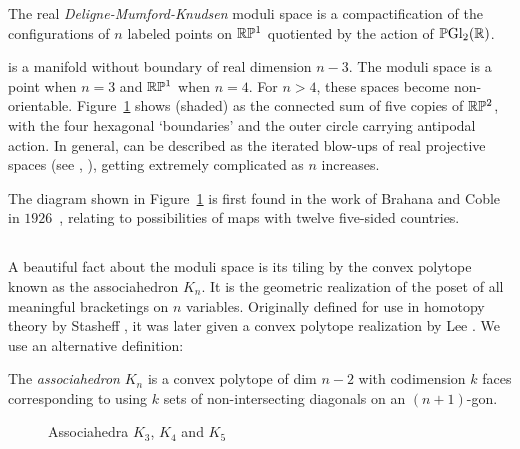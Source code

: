 \documentclass[10pt]{amsart}
\begin{document}
\begin{defn}
The real {\em Deligne-Mumford-Knudsen} moduli space  is a compactification of the configurations of $n$ labeled points on ${\mathbb R} {\mathbb P}^1$ quotiented by the action of ${\mathbb P} {\rm Gl}_2({\mathbb R})$.
\end{defn}

 is a manifold without boundary of real dimension $n-3$. The moduli space is a point when $n=3$ and ${\mathbb R}{\mathbb P}^1$ when $n=4$. For $n>4$, these spaces become non-orientable. Figure~\ref{m05} shows  (shaded) as the connected sum of five copies of ${\mathbb R} {\mathbb P}^2$, with the four hexagonal `boundaries' and the outer circle carrying antipodal action.  In general,  can be described as the iterated blow-ups of real projective spaces (see \cite[\S4]{kap}, \cite[\S4]{dev}), getting extremely complicated as $n$ increases.

\begin{figure}[h]
\caption{}
\label{m05}
\end{figure}

\begin{rem}
The diagram shown in Figure~\ref{m05} is first found in the work of Brahana and Coble in $1926$~\cite[\S1]{bc}, relating to possibilities of maps with twelve five-sided countries.
\end{rem}


\subsection{}
A beautiful fact about the moduli space is its tiling by the convex polytope known as the associahedron $K_n$.  It is the geometric realization of the poset of all meaningful bracketings on $n$ variables.  Originally defined for use in homotopy theory by Stasheff \cite[\S2]{jds}, it was later given a convex polytope realization by Lee \cite{lee}. We use an alternative definition:

\begin{defn}
The {\em associahedron} $K_n$ is a convex polytope of dim $n-2$ with codimension $k$ faces corresponding to using $k$ sets of non-intersecting diagonals on an $(n+1)$-gon.
\end{defn}

\begin{figure}[h]
\caption{Associahedra $K_3$, $K_4$ and $K_5$}
\label{k3k4k5}
\end{figure}
\end{document}
